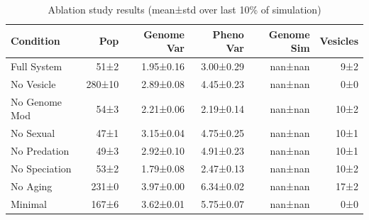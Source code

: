 \begin{table}[h]
\centering
\caption{Ablation study results (mean±std over last 10\% of simulation)}
\label{tab:ablation}
\begin{tabular}{lrrrrr}
\toprule
Condition & Pop & Genome Var & Pheno Var & Genome Sim & Vesicles \\
\midrule
Full System & 51±2 & 1.95±0.16 & 3.00±0.29 & nan±nan & 9±2 \\
No Vesicle & 280±10 & 2.89±0.08 & 4.45±0.23 & nan±nan & 0±0 \\
No Genome Mod & 54±3 & 2.21±0.06 & 2.19±0.14 & nan±nan & 10±2 \\
No Sexual & 47±1 & 3.15±0.04 & 4.75±0.25 & nan±nan & 10±1 \\
No Predation & 49±3 & 2.92±0.10 & 4.91±0.23 & nan±nan & 10±1 \\
No Speciation & 53±2 & 1.79±0.08 & 2.47±0.13 & nan±nan & 10±2 \\
No Aging & 231±0 & 3.97±0.00 & 6.34±0.02 & nan±nan & 17±2 \\
Minimal & 167±6 & 3.62±0.01 & 5.75±0.07 & nan±nan & 0±0 \\
\bottomrule
\end{tabular}
\end{table}
